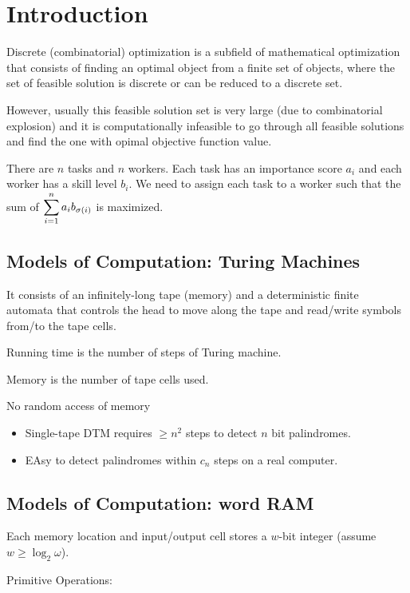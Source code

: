 
\section{Introduction}
Discrete (combinatorial) optimization is a subfield of mathematical optimization that consists of finding an optimal object from a finite set of objects, where the set of feasible solution is discrete or can be reduced to a discrete set.

However, usually this feasible solution set is very large (due to combinatorial explosion) and it is computationally infeasible to go through all feasible solutions and find the  one with opimal objective function value.

\begin{example}
    There are  $ n  $ tasks and  $ n $ workers. Each task has an importance score  $ a_i $ and each worker has a skill level  $ b_i $. We need to assign each task to a worker such that the sum of  $ \displaystyle\sum_{i=1}^n a_ib_{\sigma(i)}$  is maximized.  
\end{example}
\subsection{Models of Computation: Turing Machines}
\begin{definition}
    It consists of an infinitely-long tape (memory) and a deterministic finite automata that controls the head to move along the tape and read/write symbols from/to the tape cells.
\end{definition}
\begin{definition}
    Running time is the number of steps of Turing machine.

    Memory is the number of tape cells used.
\end{definition}

\begin{definition}[Caveat]
    No random access of memory 
    \begin{itemize}
        \item Single-tape DTM requires  $ \geq n^2 $ steps to detect  $ n $ bit palindromes.
        \item EAsy to detect palindromes within  $ c_n $ steps on a real computer.  
    \end{itemize}
\end{definition}
\subsection{Models of Computation: word RAM}
\begin{definition}
    Each memory location and input/output cell stores a  $ w $-bit integer (assume  $ w \geq \log_2\omega $).

    Primitive Operations:
\end{definition}

